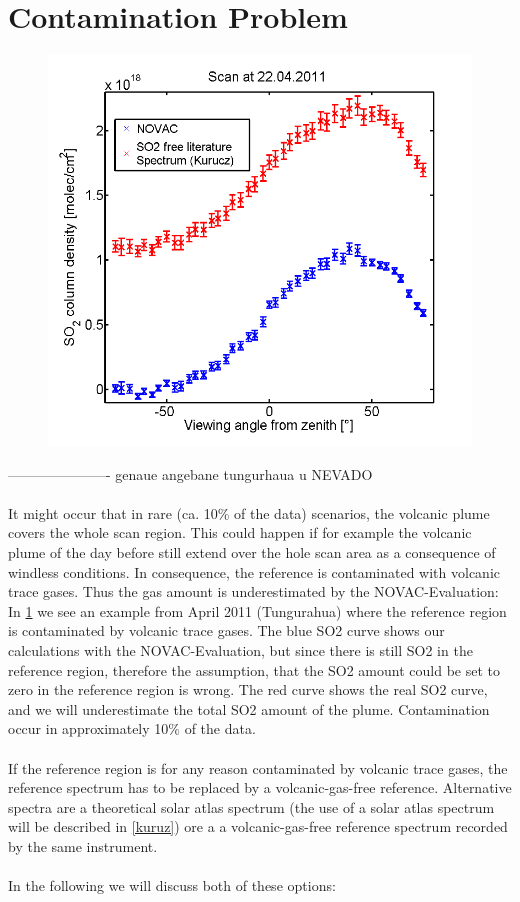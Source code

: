 \documentclass  [
  paper    = a4,
  BCOR     = 10mm,
  twoside,
  fontsize = 12pt,
  fleqn,
  toc      = bibnumbered,
  toc      = listofnumbered,
  numbers  = noendperiod,
  headings = normal,
  listof   = leveldown,
  version  = 3.03
]                                       {scrreprt}
\begin{document}
	

	\section{Contamination Problem}
	\begin{figure}
		\centering
		\includegraphics[width=0.7\linewidth]{Bilder/contaminated}
		\caption{}
		\label{fig:contaminated}
	\end{figure}
	---------------------- genaue angebane tungurhaua u NEVADO\\
	\\
	It might occur that in rare (ca. 10\% of the data) scenarios, the
	volcanic plume covers the whole scan region.
	This could happen if for example the volcanic plume of the day before still extend over the hole scan area as a consequence of windless conditions.
	In consequence, the reference	is contaminated with volcanic trace gases. Thus the gas amount is underestimated by the NOVAC-Evaluation: In \cref{fig:contaminated} we see an example from April 2011 (Tungurahua) where the reference region is contaminated by volcanic trace gases. The blue SO2 curve shows our calculations with the NOVAC-Evaluation, but since there is still SO2 in the reference region, therefore the assumption, that the SO2 amount could be set to zero in the reference region is wrong. The red curve shows the real SO2 curve, and we will underestimate the total SO2 amount of the plume. Contamination occur in approximately 10$\%$ of the data.\\
	\\
	If the reference region is for any reason
	contaminated by volcanic trace gases, the reference spectrum has to be
	replaced by a volcanic-gas-free reference. Alternative spectra are a
	theoretical solar atlas spectrum (the use of a solar atlas spectrum will be described in \cref{kuruz}) ore a a volcanic-gas-free reference
	spectrum recorded by the same instrument.\\ 
	\\
	In the following we will discuss both of these options:
\end{document}
